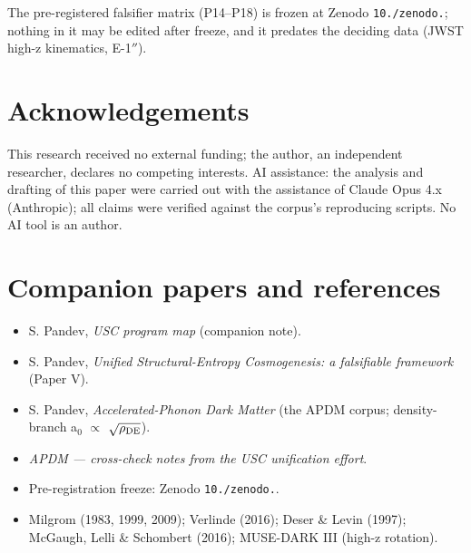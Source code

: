 \documentclass[aps,prd,preprint,nofootinbib,superscriptaddress]{revtex4-2}
\providecommand{\tightlist}{\setlength{\itemsep}{0pt}\setlength{\parskip}{0pt}}
\begin{document}
The pre-registered falsifier matrix (P14--P18) is frozen at Zenodo
\texttt{10./\allowbreak zenodo.}; nothing in it may be edited after
freeze, and it predates the deciding data (JWST high-z kinematics,
E-1\(''\)).

\section*{Acknowledgements}\label{acknowledgements}

This research received no external funding; the author, an independent
researcher, declares no competing interests. AI assistance: the analysis
and drafting of this paper were carried out with the assistance of
Claude Opus 4.x (Anthropic); all claims were verified against the
corpus's reproducing scripts. No AI tool is an author.

\section{Companion papers and
references}\label{companion-papers-and-references}

\begin{itemize}
\tightlist
\item
  S. Pandev, \emph{USC program map} (companion note).
\item
  S. Pandev, \emph{Unified Structural-Entropy Cosmogenesis: a
  falsifiable framework} (Paper V).
\item
  S. Pandev, \emph{Accelerated-Phonon Dark Matter} (the APDM corpus;
  density-branch a\(_{0}\) \(\propto\) \(\sqrt{\rho_{\rm DE}}\)).
\item
  \emph{APDM --- cross-check notes from the USC unification effort}.
\item
  Pre-registration freeze: Zenodo \texttt{10./\allowbreak zenodo.}.
\item
  Milgrom (1983, 1999, 2009); Verlinde (2016); Deser \& Levin (1997);
  McGaugh, Lelli \& Schombert (2016); MUSE-DARK III (high-z rotation).
\end{itemize}



\end{document}
